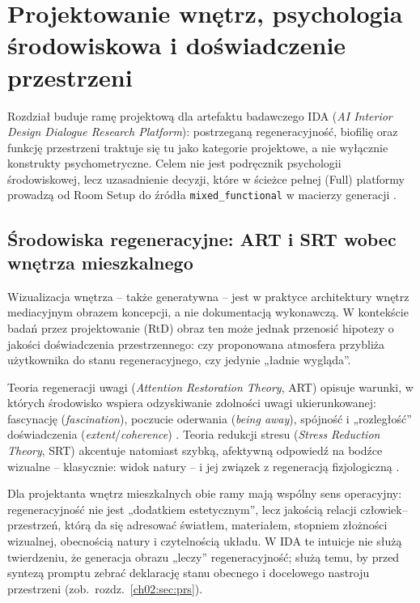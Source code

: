 \chapter{Projektowanie wnętrz, psychologia środowiskowa i doświadczenie przestrzeni}
\label{ch02:top}

Rozdział buduje ramę projektową dla artefaktu badawczego IDA (\emph{AI Interior Design Dialogue Research Platform}): postrzeganą regeneracyjność, biofilię oraz funkcję przestrzeni traktuje się tu jako kategorie projektowe, a nie wyłącznie konstrukty psychometryczne.
Celem nie jest podręcznik psychologii środowiskowej, lecz uzasadnienie decyzji, które w ścieżce pełnej (Full) platformy prowadzą od Room Setup do źródła \texttt{mixed\_functional} w macierzy generacji \parencite{idaPlatform2026}.

\section{Środowiska regeneracyjne: ART i SRT wobec wnętrza mieszkalnego}
\label{ch02:sec:art}

Wizualizacja wnętrza -- także generatywna -- jest w praktyce architektury wnętrz mediacyjnym obrazem koncepcji, a nie dokumentacją wykonawczą.
W kontekście badań przez projektowanie (RtD) obraz ten może jednak przenosić hipotezy o jakości doświadczenia przestrzennego: czy proponowana atmosfera przybliża użytkownika do stanu regeneracyjnego, czy jedynie „ładnie wygląda”.

Teoria regeneracji uwagi (\emph{Attention Restoration Theory}, ART) opisuje warunki, w których środowisko wspiera odzyskiwanie zdolności uwagi ukierunkowanej: fascynację (\emph{fascination}), poczucie oderwania (\emph{being away}), spójność i „rozległość” doświadczenia (\emph{extent}/\emph{coherence}) \parencite{kaplan1995restorative}.
Teoria redukcji stresu (\emph{Stress Reduction Theory}, SRT) akcentuje natomiast szybką, afektywną odpowiedź na bodźce wizualne -- klasycznie: widok natury -- i jej związek z regeneracją fizjologiczną \parencite{ulrich1984window}.

Dla projektanta wnętrz mieszkalnych obie ramy mają wspólny sens operacyjny: regeneracyjność nie jest „dodatkiem estetycznym”, lecz jakością relacji człowiek--przestrzeń, którą da się adresować światłem, materiałem, stopniem złożności wizualnej, obecnością natury i czytelnością układu.
W IDA te intuicje nie służą twierdzeniu, że generacja obrazu „leczy” regeneracyjność; służą temu, by przed syntezą promptu zebrać deklarację stanu obecnego i docelowego nastroju przestrzeni (zob.\ rozdz.~\ref{ch02:sec:prs}).

